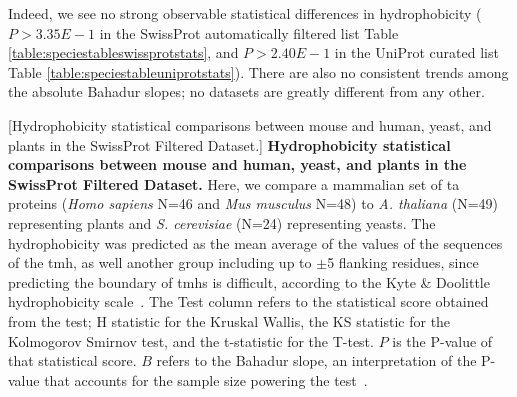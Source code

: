 Indeed, we see no strong observable statistical differences in hydrophobicity ($P>3.35E-1$ in the SwissProt automatically filtered list Table \ref{table:speciestableswissprotstats}, and $P>2.40E-1$ in the UniProt curated list Table \ref{table:speciestableuniprotstats}).
There are also no consistent trends among the absolute Bahadur slopes; no datasets are greatly different from any other.

\begin{table}[htbp]
\centering
{}[Hydrophobicity statistical comparisons between mouse and human, yeast, and plants in the SwissProt Filtered Dataset.]
{\textbf{Hydrophobicity statistical comparisons between mouse and human, yeast, and plants in the SwissProt Filtered Dataset.}
Here, we compare a mammalian set of \gls{ta} proteins (\textit{Homo sapiens} N=46 and \textit{Mus musculus} N=48) to \textit{A. thaliana} (N=49) representing plants  and  \textit{S. cerevisiae} (N=24) representing yeasts.
The hydrophobicity was predicted as the mean average of the values of the sequences of the \gls{tmh}, as well another group including up to $\pm$5 flanking residues, since predicting the boundary of \gls{tmh}s is difficult, according to the Kyte \& Doolittle hydrophobicity scale~\cite{Kyte1982}.
The Test column refers to the statistical score obtained from the test; H statistic for the Kruskal Wallis, the KS statistic for the Kolmogorov Smirnov test, and the t-statistic for the T-test.
$P$ is the P\--value of that statistical score.
$B$ refers to the Bahadur slope, an interpretation of the P\--value that accounts for the sample size powering the test~\cite{Bahadur1967, Bahadur1971}.}
\tiny


\end{table}
